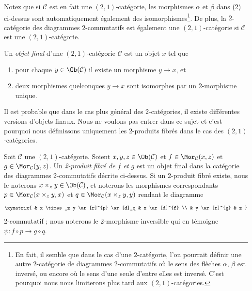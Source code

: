 Notez que si $\mathcal{C}$ est en fait une $(2, 1)$-catégorie, les morphismes
$\alpha$ et $\beta$ dans (2) ci-dessus sont automatiquement également des
isomorphismes\footnote{En fait, il semble que dans le cas d'une $2$-catégorie,
l'on pourrait définir une autre 2-catégorie de diagrammes 2-commutatifs où le
sens des flèches $\alpha$, $\beta$ est inversé, ou encore où le sens d'une
seule d'entre elles est inversé. C'est pourquoi nous nous limiterons plus tard
aux $(2, 1)$-catégories.}. De plus, la $2$-catégorie des diagrammes
$2$-commutatifs est également une $(2, 1)$-catégorie si $\mathcal{C}$ est une
$(2, 1)$-catégorie.

\begin{definition}
\label{definition-final-object-2-category}
Un {\it objet final} d'une $(2, 1)$-catégorie $\mathcal{C}$ est un objet $x$
tel que
\begin{enumerate}
\item pour chaque $y \in \Ob(\mathcal{C})$ il existe un morphisme $y \to x$,
et
\item deux morphismes quelconques $y \to x$ sont isomorphes par un 2-morphisme
unique.
\end{enumerate}
\end{definition}

\noindent
Il est probable que dans le cas plus général des $2$-catégories, il existe
différentes versions d'objets finaux. Nous ne voulons pas entrer dans ce sujet
et c'est pourquoi nous définissons uniquement les $2$-produits fibrés dans
le cas des $(2, 1)$-catégories.

\begin{definition}
\label{definition-2-fibre-products}
Soit $\mathcal{C}$ une $(2, 1)$-catégorie. Soient $x, y, z\in \Ob(\mathcal{C})$ et $f\in \Mor_\mathcal{C}(x, z)$ et $g\in \Mor_{\mathcal C}(y, z)$. Un {\it 2-produit fibré de $f$ et $g$} est un objet final dans
la catégorie des diagrammes 2-commutatifs décrite ci-dessus. Si un 2-produit
fibré existe, nous le noterons $x \times_z y\in \Ob(\mathcal{C})$, et
noterons les morphismes correspondants $p\in \Mor_{\mathcal C}(x \times_z y, x)$ et
$q\in \Mor_{\mathcal C}(x \times_z y, y)$ rendant le diagramme
$$
\xymatrix{
& x \times_z y \ar[r]^{p} \ar[d]_q & x \ar[d]^{f} \\
& y \ar[r]^{g} & z }
$$
2-commutatif ; nous noterons le 2-morphisme inversible qui en témoigne
$\psi : f \circ p \to g \circ q$.
\end{definition}

